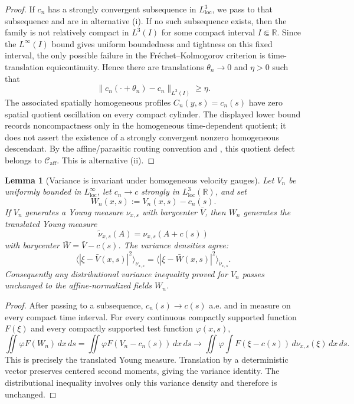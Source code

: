 \documentclass[11pt]{amsart}
\numberwithin{equation}{section}
\theoremstyle{plain}
\newtheorem{lemma}[lemma]{Lemma}
\theoremstyle{definition}
\theoremstyle{remark}
\newcommand{\loc}{\mathrm{loc}}
\newcommand{\Caff}{\mathcal C_{\mathrm{aff}}}
\begin{document}
\begin{proof}
If \(c_n\) has a strongly convergent subsequence in \(L^3_{\loc}\), we pass to
that subsequence and are in alternative \textup{(i)}.  If no such subsequence
exists, then the family is not relatively compact in \(L^3(I)\) for some
compact interval \(I\Subset\mathbb R\).  Since the \(L^\infty(I)\) bound gives
uniform boundedness and tightness on this fixed interval, the only possible
failure in the Fr\'echet--Kolmogorov criterion is time-translation
equicontinuity.  Hence there are translations \(\theta_n\to0\) and
\(\eta>0\) such that
\[
   \|c_n(\cdot+\theta_n)-c_n\|_{L^3(I)}\ge\eta .
\]
The associated spatially homogeneous profiles \(C_n(y,s)=c_n(s)\) have zero
spatial quotient oscillation on every compact cylinder.  The displayed lower
bound records noncompactness only in the homogeneous time-dependent quotient;
it does not assert the existence of a strongly convergent nonzero homogeneous
descendant.  By the affine/parasitic routing convention and
, this quotient defect belongs
to \(\Caff\).  This is alternative \textup{(ii)}.
\end{proof}

\begin{lemma}[Variance is invariant under homogeneous velocity gauges]
\label{lem:variance-homogeneous-shift}
Let \(V_n\) be uniformly bounded in \(L^\infty_{\loc}\), let
\(c_n\to c\) strongly in \(L^3_{\loc}(\mathbb R)\), and set
\[
   W_n(x,s):=V_n(x,s)-c_n(s).
\]
If \(V_n\) generates a Young measure \(\nu_{x,s}\) with barycenter
\(\bar V\), then \(W_n\) generates the translated Young measure
\[
   \widetilde\nu_{x,s}(A)=\nu_{x,s}(A+c(s))
\]
with barycenter \(\bar W=\bar V-c(s)\).  The variance densities agree:
\[
   \langle|\xi-\bar V(x,s)|^2\rangle_{\nu_{x,s}}
   =
   \langle|\xi-\bar W(x,s)|^2\rangle_{\widetilde\nu_{x,s}} .
\]
Consequently any distributional variance inequality proved for \(V_n\) passes
unchanged to the affine-normalized fields \(W_n\).
\end{lemma}

\begin{proof}
After passing to a subsequence, \(c_n(s)\to c(s)\) a.e. and in measure on every
compact time interval.  For every continuous compactly supported function
\(F(\xi)\) and every compactly supported test function \(\varphi(x,s)\),
\[
   \iint \varphi F(W_n)\,dx\,ds
   =
   \iint \varphi F(V_n-c_n(s))\,dx\,ds
   \to
   \iint\varphi\int F(\xi-c(s))\,d\nu_{x,s}(\xi)\,dx\,ds .
\]
This is precisely the translated Young measure.  Translation by a deterministic
vector preserves centered second moments, giving the variance identity.  The
distributional inequality involves only this variance density and therefore is
unchanged.
\end{proof}
\end{document}
